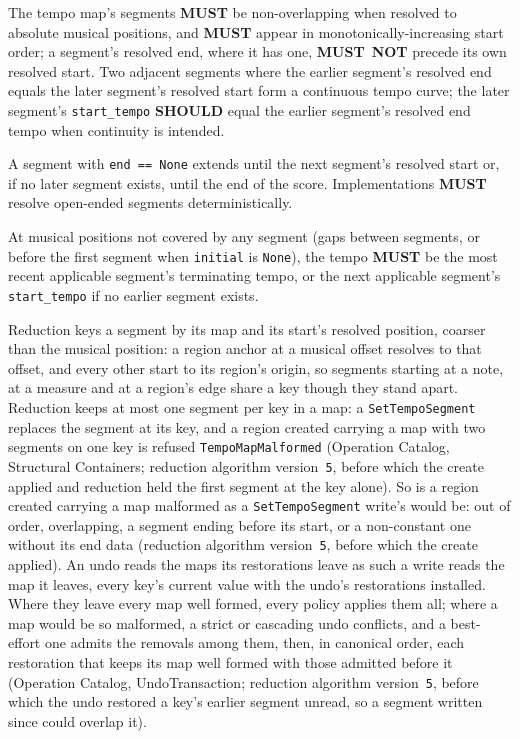 \documentclass[11pt,letterpaper]{report}
\newcommand{\sectionsc}[1]{{\addfontfeatures{Letters=SmallCaps}#1}}
\newcounter{requirement}[chapter]
\newcommand{\MUST}{\textbf{MUST}}
\newcommand{\MUSTNOT}{\textbf{MUST}\nobreak\ \textbf{NOT}}
\newcommand{\SHOULD}{\textbf{SHOULD}}
\begin{document}
\begin{requirement}
  \label{req:time:tempo-segment-order}
  The tempo map's segments \MUST{} be non-overlapping when resolved
  to absolute musical positions, and \MUST{} appear in
  monotonically-increasing start order; a segment's resolved end, where
  it has one, \MUSTNOT{} precede its own resolved start. Two adjacent segments where
  the earlier segment's resolved end equals the later segment's
  resolved start form a continuous tempo curve; the later segment's
  \texttt{start\_tempo} \SHOULD{} equal the earlier segment's resolved
  end tempo when continuity is intended.

  A segment with \texttt{end == None} extends until the next
  segment's resolved start or, if no later segment exists, until the
  end of the score. Implementations \MUST{} resolve open-ended
  segments deterministically.

  At musical positions not covered by any segment (gaps between
  segments, or before the first segment when \texttt{initial} is
  \texttt{None}), the tempo \MUST{} be the most recent applicable
  segment's terminating tempo, or the next applicable segment's
  \texttt{start\_tempo} if no earlier segment exists.

  Reduction keys a segment by its map and its start's resolved
  position, coarser than the musical position: a region anchor at a
  musical offset resolves to that offset, and every other start to its
  region's origin, so segments starting at a note, at a measure and at a
  region's edge share a key though they stand apart. Reduction keeps at
  most one segment per key in a map: a \texttt{SetTempoSegment} replaces
  the segment at its key, and a region created carrying a map with two
  segments on one key is refused \texttt{TempoMapMalformed} (Operation
  Catalog, \sectionsc{Structural Containers}; reduction algorithm
  version~\texttt{5}, before which the create applied and reduction held
  the first segment at the key alone). So is a region created carrying a
  map malformed as a \texttt{SetTempoSegment} write's would be: out of
  order, overlapping, a segment ending before its start, or a non-constant
  one without its end data (reduction algorithm version~\texttt{5}, before
  which the create applied). An undo reads the maps its restorations leave
  as such a write reads the map it leaves, every key's current value with
  the undo's restorations installed. Where they leave every map well
  formed, every policy applies them all; where a map would be so malformed,
  a strict or cascading undo conflicts, and a best-effort one admits the
  removals among them, then, in canonical order, each restoration that
  keeps its map well formed with those admitted before it (Operation Catalog,
  \sectionsc{UndoTransaction}; reduction algorithm version~\texttt{5},
  before which the undo restored a key's earlier segment unread, so a
  segment written since could overlap it).
\end{requirement}
\end{document}
